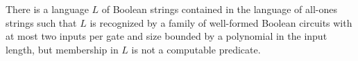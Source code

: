 \begin{theorem}
\label{Language.exists_le_allOnes_inPPoly_not_computablePred}
\leanok
{}
There is a language $L$ of Boolean strings contained in the language of all-ones strings
such that $L$ is recognized by a family of well-formed Boolean circuits with at most two
inputs per gate and size bounded by a polynomial in the input length, but membership in
$L$ is not a computable predicate.
\end{theorem}
